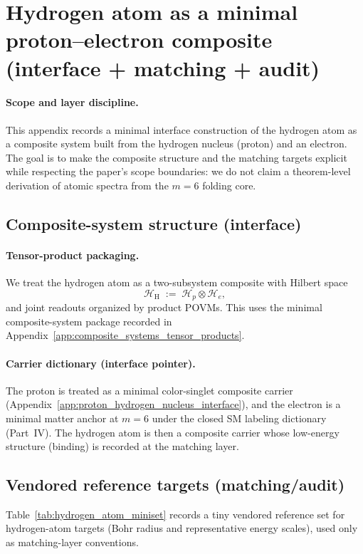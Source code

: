 \section{Hydrogen atom as a minimal proton--electron composite (interface + matching + audit)}
\label{app:hydrogen_atom_interface}

\paragraph{Scope and layer discipline.}
\InterfaceTag This appendix records a minimal interface construction of the hydrogen atom as a composite system built from the hydrogen nucleus (proton) and an electron.
The goal is to make the composite structure and the matching targets explicit while respecting the paper's scope boundaries: we do not claim a theorem-level derivation of atomic spectra from the $m=6$ folding core.

\subsection{Composite-system structure (interface)}
\paragraph{Tensor-product packaging.}
\InterfaceTag We treat the hydrogen atom as a two-subsystem composite with Hilbert space
\[
\mathcal{H}_{\mathrm{H}} \;:=\; \mathcal{H}_p\otimes \mathcal{H}_e,
\]
and joint readouts organized by product POVMs.
This uses the minimal composite-system package recorded in Appendix~\ref{app:composite_systems_tensor_products}.

\paragraph{Carrier dictionary (interface pointer).}
\InterfaceTag The proton is treated as a minimal color-singlet composite carrier (Appendix~\ref{app:proton_hydrogen_nucleus_interface}), and the electron is a minimal matter anchor at $m=6$ under the closed SM labeling dictionary (Part~IV).
The hydrogen atom is then a composite carrier whose low-energy structure (binding) is recorded at the matching layer.

\subsection{Vendored reference targets (matching/audit)}
\label{subsec:hydrogen_atom_miniset}
\MatchTag Table~\ref{tab:hydrogen_atom_miniset} records a tiny vendored reference set for hydrogen-atom targets (Bohr radius and representative energy scales), used only as matching-layer conventions.

